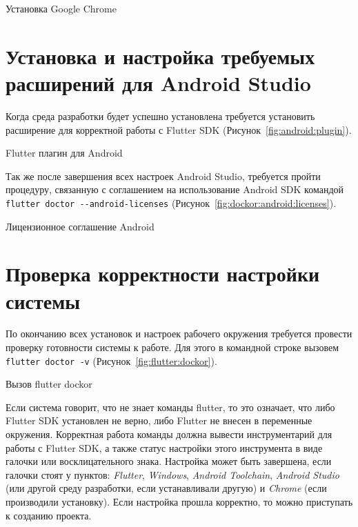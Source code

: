 \begin{image}
	\caption{Установка Google Chrome}
	\label{fig:install:chrome}
\end{image}

\clearpage

\section{Установка и настройка требуемых расширений для Android Studio}

Когда среда разработки будет успешно установлена требуется
установить расширение для корректной работы с Flutter SDK
(Рисунок~\ref{fig:android:plugin}).

\begin{image}
	\caption{Flutter плагин для Android}
	\label{fig:android:plugin}
\end{image}


\clearpage

Так же после завершения всех настроек Android Studio,
требуется пройти процедуру, связанную с соглашением на использование
Android SDK командой \verb|flutter doctor --android-licenses|
(Рисунок~\ref{fig:dockor:android:licenses}).

\begin{image}
	\caption{Лицензионное соглашение Android}
	\label{fig:dockor:android:licenses}
\end{image}

\clearpage

\section{Проверка корректности настройки системы}

По окончанию всех установок и настроек рабочего окружения требуется
провести проверку готовности системы к работе.
Для этого в командной строке вызовем \texttt{flutter doctor -v}
(Рисунок~\ref{fig:flutter:dockor}).

\begin{image}
	\caption{Вызов flutter dockor}
	\label{fig:flutter:dockor}
\end{image}

Если система говорит, что не знает команды flutter,
то это означает, что либо Flutter SDK установлен не верно,
либо Flutter не внесен в переменные окружения.
Корректная работа команды должна вывести инструментарий
для работы с Flutter SDK,
а также статус настройки этого инструмента в виде галочки
или восклицательного знака. Настройка может быть завершена,
если галочки стоят у пунктов: \textit{Flutter}, \textit{Windows},
\textit{Android Toolchain}, \textit{Android Studio}
(или другой среду разработки, если устанавливали другую)
и \textit{Chrome} (если производили установку).
Если настройка прошла корректно, то можно приступать к созданию проекта.

